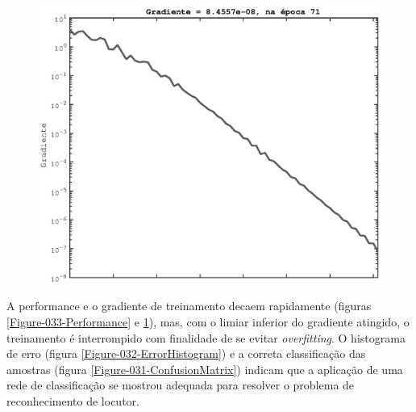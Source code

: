 \begin{figure}
  \centering
  \captionsetup{type=figure}
  \hspace*{-1.75cm}
  \includegraphics[scale=0.625]{./figures/Figure-034-Gradient.eps}
	\label{Figure-034-Gradient}
\end{figure}

A performance e o gradiente de treinamento decaem rapidamente (figuras
\ref{Figure-033-Performance} e \ref{Figure-034-Gradient}), mas, com o limiar
inferior do gradiente atingido, o treinamento é interrompido com finalidade de
se evitar \textit{overfitting}. O histograma de erro (figura
\ref{Figure-032-ErrorHistogram}) e a correta classificação das amostras (figura
\ref{Figure-031-ConfusionMatrix}) indicam que a aplicação de uma rede de
classificação se mostrou adequada para resolver o problema de reconhecimento de
locutor.
